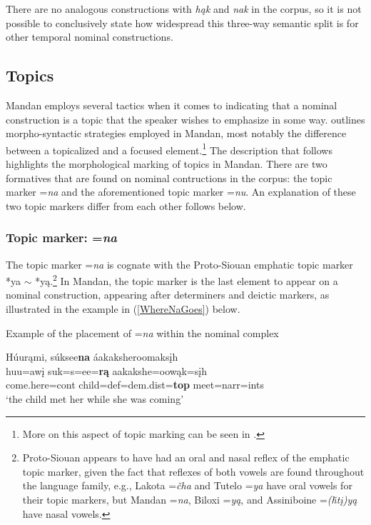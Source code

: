 There are no analogous constructions with \textit{hąk} and \textit{nak} in the corpus, so it is not possible to conclusively state how widespread this three-way semantic split is for other temporal nominal constructions. 


\subsection{Topics}\label{SubSecTopics}

Mandan employs several tactics when it comes to indicating that a nominal construction is a topic that the speaker wishes to emphasize in some way. \citet{kasak2022} outlines morpho-syntactic strategies employed in Mandan, most notably the difference between a topicalized and a focused element.\footnote{More on this aspect of topic marking can be seen in .} The description that follows highlights the morphological marking of topics in Mandan. There are two formatives that are found on nominal contructions in the corpus: the topic marker =\textit{na} and the aforementioned topic marker =\textit{nu}. An explanation of these two topic markers differ from each other follows below.

\subsubsection{Topic marker: =\textit{na}}\label{SubSubSubSecNa}

The topic marker =\textit{na} is cognate with the Proto-Siouan emphatic topic marker *ya $\sim$ *yą.\footnote{Proto-Siouan appears to have had an oral and nasal reflex of the emphatic topic marker, given the fact that reflexes of both vowels are found throughout the language family, e.g., Lakota =\textit{čha} and Tutelo =\textit{ya} have oral vowels for their topic markers, but Mandan =\textit{na}, Biloxi =\textit{yą}, and Assiniboine =\textit{(ȟtį)yą} have nasal vowels.} In Mandan, the topic marker is the last element to appear on a nominal construction, appearing after determiners and deictic markers, as illustrated in the example in (\ref{WhereNaGoes}) below.

\begin{exe}
    \item\label{WhereNaGoes} Example of the placement of =\textit{na} within the nominal complex

    \glll Húurąmi, súksee\textbf{na} áakaksheroomaksįh\\
    huu=awį suk=s=ee=\textbf{rą} aakakshe=oowąk=sįh\\
    \textnormal{come.here}=cont \textnormal{child}=def=dem.dist=\textbf{top} \textnormal{meet}=narr=ints\\
    \glt `the child met her while she was coming' \citep[89]{hollow1973a}
\end{exe}

